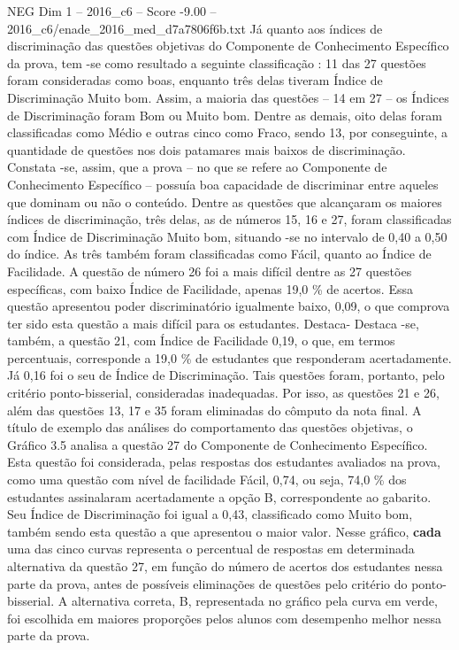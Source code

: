 \begin{textsample}{NEG Dim 1 – 2016\_c6 – Score -9.00 – 2016\_c6/enade\_2016\_med\_d7a7806f6b.txt}
Já quanto aos índices de discriminação das questões objetivas do Componente de Conhecimento Específico da prova, tem -se como resultado a seguinte classificação : 11 das 27 questões foram consideradas como boas, enquanto três delas tiveram Índice de Discriminação Muito bom.
Assim, a maioria das questões – 14 em 27 – os Índices de Discriminação foram Bom ou Muito bom.
Dentre as demais, oito delas foram classificadas como Médio e outras cinco como Fraco, sendo 13, por conseguinte, a quantidade de questões nos dois patamares mais baixos de discriminação.
Constata -se, assim, que a prova – no que se refere ao Componente de Conhecimento Específico – possuía boa capacidade de discriminar entre aqueles que dominam ou não o conteúdo.
Dentre as questões que alcançaram os maiores índices de discriminação, três delas, as de números 15, 16 e 27, foram classificadas com Índice de Discriminação Muito bom, situando -se no intervalo de 0,40 a 0,50 do índice.
As três também foram classificadas como Fácil, quanto ao Índice de Facilidade.
A questão de número 26 foi a mais difícil dentre as 27 questões específicas, com baixo Índice de Facilidade, apenas 19,0 \% de acertos.
Essa questão apresentou poder discriminatório igualmente baixo, 0,09, o que comprova ter sido esta questão a mais difícil para os estudantes.
Destaca- Destaca -se, também, a questão 21, com Índice de Facilidade 0,19, o que, em termos percentuais, corresponde a 19,0 \% de estudantes que responderam acertadamente.
Já 0,16 foi o seu de Índice de Discriminação.
Tais questões foram, portanto, pelo critério ponto-bisserial, consideradas inadequadas.
Por isso, as questões 21 e 26, além das questões 13, 17 e 35 foram eliminadas do cômputo da nota final.
A título de exemplo das análises do comportamento das questões objetivas, o Gráfico 3.5 analisa a questão 27 do Componente de Conhecimento Específico.
Esta questão foi considerada, pelas respostas dos estudantes avaliados na prova, como uma questão com nível de facilidade Fácil, 0,74, ou seja, 74,0 \% dos estudantes assinalaram acertadamente a opção B, correspondente ao gabarito.
Seu Índice de Discriminação foi igual a 0,43, classificado como Muito bom, também sendo esta questão a que apresentou o maior valor.
Nesse gráfico, \textbf{cada} uma das cinco curvas representa o percentual de respostas em determinada alternativa da questão 27, em função do número de acertos dos estudantes nessa parte da prova, antes de possíveis eliminações de questões pelo critério do ponto-bisserial.
A alternativa correta, B, representada no gráfico pela curva em verde, foi escolhida em maiores proporções pelos alunos com desempenho melhor nessa parte da prova.

\end{textsample}
